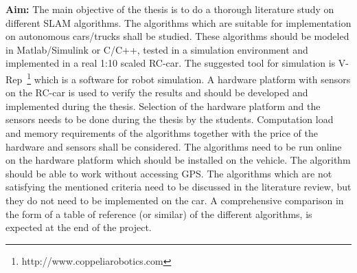 \documentclass[12pt]{article}
\begin{document}
\textbf{Aim:} The main objective of the thesis is to do a thorough literature study on different SLAM algorithms. The algorithms which are suitable for implementation on autonomous cars/trucks shall be studied. These algorithms should be modeled in Matlab/Simulink or C/C++, tested in a simulation environment and implemented in a real 1:10 scaled RC-car. The suggested tool for simulation is V-Rep~\footnote{http://www.coppeliarobotics.com} which is a software for robot simulation. A hardware platform with sensors on the RC-car is used to verify the results and should be developed and implemented during the thesis. Selection of the hardware platform and the sensors needs to be done during the thesis by the students. Computation load and memory requirements of the algorithms together with the price of the hardware and sensors shall be considered. The algorithms need to be run online on the hardware platform which should be installed on the vehicle. The algorithm should be able to work without accessing GPS. The algorithms which are not satisfying the mentioned criteria need to be discussed in the literature review, but they do not need to be implemented on the car. A comprehensive comparison in the form of a table of reference (or similar) of the different algorithms, is expected at the end of the project.   
\end{document}
